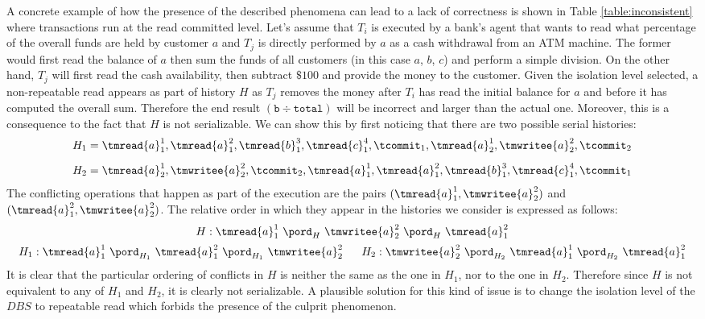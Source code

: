 A concrete example of how the presence of the described phenomena can lead to a lack of correctness is shown in Table \ref{table:inconsistent} where transactions run at the read committed level. Let's assume that $T_i$ is executed by a bank's agent that wants to read what percentage of the overall funds are held by customer $a$ and $T_j$ is directly performed by $a$ as a cash withdrawal from an ATM machine. The former would first read the balance of $a$ then sum the funds of all customers (in this case $a$, $b$, $c$) and perform a simple division. On the other hand, $T_j$ will first read the cash availability, then subtract $\$100$ and provide the money to the customer. Given the isolation level selected, a non-repeatable read appears as part of history $H$ as $T_j$ removes the money after $T_i$ has read the initial balance for $a$ and before it has computed the overall sum. Therefore the end result $(\texttt{b}\div\texttt{total})$ will be incorrect and larger than the actual one. Moreover, this is a consequence to the fact that $H$ is not serializable. We can show this by first noticing that there are two possible serial histories:
\begin{align*}
	H_1 &= \tmread{a}_1^1, \tmread{a}_1^2, \tmread{b}_1^3, \tmread{c}_1^4, \tcommit_1, \tmread{a}_2^1, \tmwritee{a}_2^2, \tcommit_2 \\[0.5em]
	H_2 &= \tmread{a}_2^1, \tmwritee{a}_2^2, \tcommit_2, \tmread{a}_1^1, \tmread{a}_1^2, \tmread{b}_1^3, \tmread{c}_1^4, \tcommit_1
\end{align*}
The conflicting operations that happen as part of the execution are the pairs $(\tmread{a}_1^1, \tmwritee{a}_2^2)$ and $(\tmread{a}_1^2, \tmwritee{a}_2^2)$. The relative order in which they appear in the histories we consider is expressed as follows:
\[
	\begin{array}{c}
		H: \tmread{a}_1^1\ \pord_H\ \tmwritee{a}_2^2\ \pord_H\ \tmread{a}_1^2
		\\[0.5em]
		\begin{array}{c c}
			H_1 : \tmread{a}_1^1\ \pord_{H_1}\ \tmread{a}_1^2\ \pord_{H_1}\ \tmwritee{a}_2^2\
			&\
			H_2 : \tmwritee{a}_2^2\ \pord_{H_2}\ \tmread{a}_1^1\ \pord_{H_2}\ \tmread{a}_1^2
		\end{array}
	\end{array}
\]
It is clear that the particular ordering of conflicts in $H$ is neither the same as the one in $H_1$, nor to the one in $H_2$. Therefore since $H$ is not equivalent to any of $H_1$ and $H_2$, it is clearly not serializable. A plausible solution for this kind of issue is to change the isolation level of the $DBS$ to repeatable read which forbids the presence of the culprit phenomenon.
